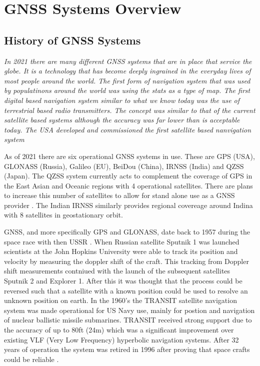 
\chapter{GNSS Systems Overview} %

\label{Chapter2} %


\section{History of GNSS Systems} \label{sec:GNSSHistory}
\emph{In 2021 there are many different GNSS systems that are in place that service the globe. It is a technology that has become deeply ingrained in the everyday lives of
most people around the world. The first form of navigation system that was used by populatinons around the world was using the stats as a type of map. The first digital
based navigation system similar to what we know today was the use of terrestrial based radio transmitters. The concept was similar to that of the current satellite based
systems although the accuracy was far lower than is acceptable today. The USA developed and commissioned the first satellite based nanvigation system}

As of 2021 there are six operational GNSS systems in use. These are GPS (USA), GLONASS (Russia), Galileo (EU), BeiDou (China), IRNSS (India) and QZSS (Japan). The QZSS
system currently acts to complement the coverage of GPS in the East Asian and Oceanic regions with 4 operational satellites. There are plans to increase this number of
satellites to allow for stand alone use as a GNSS provider \cite{RN47}. The Indian IRNSS similarly provides regional covereage around Indina with 8 satellites in geostationary orbit. 

GNSS, and more specifically GPS and GLONASS, date back to 1957 during the space race with then USSR \cite{RN43}. When Russian satellite Sputnik 1 was launched scientists at the John Hopkins University were able to track its position and velocity by measuring the doppler shift of the
craft. This tracking from Doppler shift measurements contniued with the launch of the subsequent satellites Sputnik 2 and Explorer 1. After this it was thought that the
process could be reversed such that a satellite with a known position could be used to resolve an unknown position on earth. In the 1960's the TRANSIT satellite
navigation system was made operational for US Navy use, mainly for postion and navigation of nuclear ballistic missile submarines. TRANSIT received strong support due to
the accuracy of up to 80ft (24m) which was a significant improvement over existing VLF (Very Low Frequency) hyperbolic navigation systems. After 32 years of operation the
system was retired in 1996 after proving that space crafts could be reliable \cite{RN45}. 

